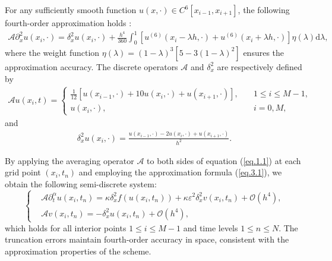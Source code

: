 \documentclass{siamart171218}
\theoremstyle{remark}
\theoremstyle{example}
\numberwithin{equation}{section}
\begin{document}
For any sufficiently smooth function $u(x,\cdot) \in C^6[x_{i-1},x_{i+1}]$, the following fourth-order approximation holds \cite{Liao2010}:
\begin{align}\label{eq.3.1}
\mathscr{A} \partial_x^2u(x_i,\cdot) = \delta_x^2u(x_i,\cdot) + \frac{h^4}{360}\int_{0}^{1}\left[u^{(6)}(x_i-\lambda h,\cdot)+u^{(6)}(x_i+\lambda h,\cdot)\right]\eta(\lambda)\mathrm{d}\lambda,
\end{align}
where the weight function $\eta(\lambda)=(1-\lambda)^3[5-3(1-\lambda)^2]$ ensures the approximation accuracy. The discrete operators $\mathscr{A}$ and $\delta_x^2$ are respectively defined by
\begin{align*}
\mathscr{A}u(x_i,t)=\begin{cases}
\frac{1}{12}\left[u(x_{i-1},\cdot)
+10u(x_{i},\cdot) +u(x_{i+1},\cdot)\right], &\quad 1 \leq i \leq M-1,\\
u(x_{i},\cdot), &\quad i=0,M,
\end{cases}
\end{align*}
and
\begin{align*}
\delta_x^2u(x_i,\cdot)=\frac{u(x_{i-1},\cdot)
-2u(x_i,\cdot)+u(x_{i+1},\cdot)}{h^2}.
\end{align*}

By applying the averaging operator $\mathscr{A}$ to both sides of equation (\ref{eq.1.1}) at each grid point $(x_i,t_{n})$ and employing the approximation formula (\ref{eq.3.1}), we obtain the following semi-discrete system:
\begin{equation}\label{eq.3.2}
\left\{
\begin{aligned}
& \mathscr{A}\partial^\alpha_t u(x_i,t_{n}) =
\kappa \delta_x^2 f(u(x_i,t_{n})) +
 \kappa \varepsilon^2 \delta_x^2 v(x_i,t_{n})
 + \mathcal{O}\left(h^4\right), \\
& \mathscr{A} v(x_i,t_{n}) = -\delta_x^2 u(x_i,t_{n})
+ \mathcal{O}\left(h^4\right),
\end{aligned}
\right.
\end{equation}
which holds for all interior points $1\leq i \leq M-1$ and time levels $1\leq n \leq N$. The truncation errors maintain fourth-order accuracy in space, consistent with the approximation properties of the scheme.
\end{document}
